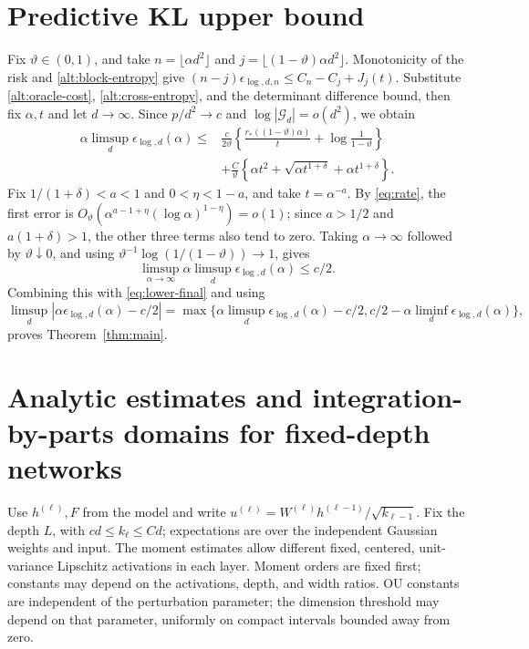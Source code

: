 \documentclass[a4paper]{tufte-handout}
\begin{document}
\begin{fullwidth}
\section{Predictive KL upper bound}
Fix $\vartheta\in(0,1)$, and take $n=\lfloor\alpha d^2\rfloor$ and
$j=\lfloor(1-\vartheta)\alpha d^2\rfloor$. Monotonicity of the risk and
\eqref{alt:block-entropy} give
$(n-j)\epsilon_{\log,d,n}\le C_n-C_j+J_j(t)$.
Substitute \eqref{alt:oracle-cost}, \eqref{alt:cross-entropy}, and the determinant difference bound,
then fix $\alpha,t$ and let $d\to\infty$. Since $p/d^2\to c$ and
$\log|\mathcal G_d|=o(d^2)$, we obtain
\begin{equation}\label{alt:limit-upper}\begin{aligned}
 \alpha\limsup_d\epsilon_{\log,d}(\alpha)
 \le{}&\frac c{2\vartheta}\left\{
 \frac{r_*((1-\vartheta)\alpha)}t+\log\frac1{1-\vartheta}\right\}\\
 &+\frac C\vartheta\left\{\alpha t^2+
       \sqrt{\alpha t^{1+\delta}}+\alpha t^{1+\delta}\right\}.
\end{aligned}\end{equation}
Fix $1/(1+\delta)<a<1$ and $0<\eta<1-a$, and take $t=\alpha^{-a}$.
By \eqref{eq:rate}, the first error is
$O_\vartheta(\alpha^{a-1+\eta}(\log\alpha)^{1-\eta})=o(1)$;
since $a>1/2$ and $a(1+\delta)>1$, the other three terms also tend to zero. Taking $\alpha\to\infty$ followed by $\vartheta\downarrow0$, and using
$\vartheta^{-1}\log(1/(1-\vartheta))\to1$, gives
\[
 \limsup_{\alpha\to\infty}\alpha\limsup_d\epsilon_{\log,d}(\alpha)\le c/2.
\]
Combining this with \eqref{eq:lower-final} and using
\[
 \limsup_d|\alpha\epsilon_{\log,d}(\alpha)-c/2|
 =\max\{\alpha\limsup_d\epsilon_{\log,d}(\alpha)-c/2,
          c/2-\alpha\liminf_d\epsilon_{\log,d}(\alpha)\},
\]
proves Theorem~\ref{thm:main}.
\appendix
\section{Analytic estimates and integration-by-parts domains for fixed-depth networks}\label{an:appendix}\label{an:section}\label{app:local}
Use $h^{(\ell)},F$ from the model and write $u^{(\ell)}=W^{(\ell)}h^{(\ell-1)}/\sqrt{k_{\ell-1}}$.
Fix the depth $L$, with $cd\le k_\ell\le Cd$; expectations are over the independent Gaussian weights and input.
The moment estimates allow different fixed, centered, unit-variance Lipschitz activations in each layer.
Moment orders are fixed first; constants may depend on the activations, depth, and width ratios. OU constants are independent of the perturbation parameter; the dimension threshold may depend on that parameter, uniformly on compact intervals bounded away from zero.


\end{fullwidth}
\end{document}
